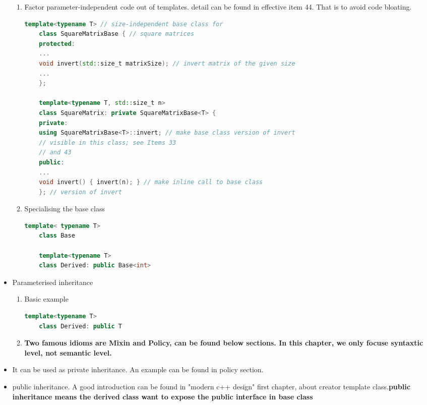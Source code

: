 \documentclass[a4paper,12pt,twoside]{book}
\begin{document}
\begin{itemize}
\begin{enumerate}
	
	\item Factor parameter-independent code out of templates. detail can be found in effective item 44. That is to avoid code bloating.
	\begin{lstlisting}[frame=single, language=c++]
	template<typename T> // size-independent base class for
	class SquareMatrixBase { // square matrices
	protected:
	...
	void invert(std::size_t matrixSize); // invert matrix of the given size
	...
	};
	
	template<typename T, std::size_t n>
	class SquareMatrix: private SquareMatrixBase<T> {
	private:
	using SquareMatrixBase<T>::invert; // make base class version of invert
	// visible in this class; see Items 33
	// and 43
	public:
	...
	void invert() { invert(n); } // make inline call to base class
	}; // version of invert
	\end{lstlisting}
	
	
	\item Specialising the base class
	\begin{lstlisting}[frame=single, language=c++]
	template< typename T>
	class Base
	
	template<typename T>
	class Derived: public Base<int>
	\end{lstlisting}
\end{enumerate}

\item Parameterised inheritance
	\begin{enumerate}	
	\item Basic example 
	\begin{lstlisting}[frame=single, language=c++]
	template<typename T>
	class Derived: public T
	\end{lstlisting}
	
	\item \textbf{Two famous idioms are Mixin and Policy, can be found below sections. In this chapter, we only focuse syntaxtic level, not semantic level.}

\end{enumerate}

\item It can be used as private inheritance. An example can be found in policy section. 

\item public inheritance. A good introduction can be found in "modern c++ design" first chapter, about creator template class.\textbf{public inheritance means the derived class want to expose the public interface in base class}


\end{itemize}
\end{document}
